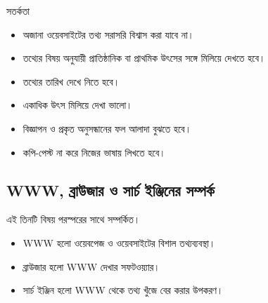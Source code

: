 \begin{keypointbox}{সতর্কতা}
\par\noindent
\begin{minipage}[t]{.48\linewidth}\vspace{0pt}
\begin{itemize}
\item অজানা ওয়েবসাইটের তথ্য সরাসরি বিশ্বাস করা যাবে না।
\item তথ্যের বিষয় অনুযায়ী প্রাতিষ্ঠানিক বা প্রাথমিক উৎসের সঙ্গে মিলিয়ে দেখতে হবে।
\item তথ্যের তারিখ দেখে নিতে হবে।
\end{itemize}
\end{minipage}\hfill
\begin{minipage}[t]{.48\linewidth}\vspace{0pt}
\begin{itemize}
\item একাধিক উৎস মিলিয়ে দেখা ভালো।
\item বিজ্ঞাপন ও প্রকৃত অনুসন্ধানের ফল আলাদা বুঝতে হবে।
\item কপি-পেস্ট না করে নিজের ভাষায় লিখতে হবে।
\end{itemize}
\end{minipage}\par

\end{keypointbox}



\subsection{WWW, ব্রাউজার ও সার্চ ইঞ্জিনের সম্পর্ক}

এই তিনটি বিষয় পরস্পরের সাথে সম্পর্কিত।

\par\noindent\begin{minipage}[t]{.60\linewidth}\vspace{0pt}\small
\begin{itemize}
\item WWW হলো ওয়েবপেজ ও ওয়েবসাইটের বিশাল তথ্যব্যবস্থা।
\item ব্রাউজার হলো WWW দেখার সফটওয়্যার।
\item সার্চ ইঞ্জিন হলো WWW থেকে তথ্য খুঁজে বের করার উপকরণ।
\end{itemize}
\end{minipage}\hfill
\begin{minipage}[t]{.36\linewidth}\vspace{0pt}\small
{}
\end{minipage}\par


